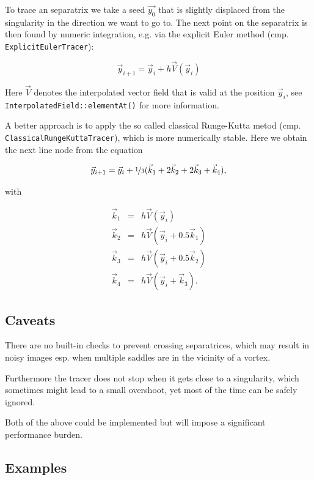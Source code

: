 \documentclass[a4paper,10pt,notitlepage]{scrreprt}
\begin{document}
To trace an separatrix we take a seed $\vec{y_0}$ that is slightly displaced
from the singularity in the direction we want to go to. The next point on the
separatrix is then found by numeric integration, e.g. via the explicit Euler
method (cmp. \texttt{ExplicitEulerTracer}):

\begin{equation}
 \vec{y}_{i+1} = \vec{y}_i + h \vec{V}(\vec{y}_i)
\end{equation}

Here $\vec{V}$ denotes the interpolated vector field that is valid at the
position $\vec{y}_i$, see \texttt{InterpolatedField::elementAt()} for more
information.

A better approach is to apply the so called classical Runge-Kutta
metod (cmp. \texttt{ClassicalRungeKuttaTracer}), which is more numerically
stable. Here we obtain the next line node from the equation

\begin{equation}
 \vec{y}_{i+1} = \vec{y}_i + \nicefrac{1}{3} (\vec{k}_1 + 2 \vec{k}_2 + 2
\vec{k}_3 + \vec{k}_4),
\end{equation}

with

\begin{eqnarray}
 \vec{k}_1 &=& h \vec{V}(\vec{y}_i) \\
 \vec{k}_2 &=& h \vec{V}(\vec{y}_i + 0.5 \vec{k}_1) \\
 \vec{k}_3 &=& h \vec{V}(\vec{y}_i + 0.5 \vec{k}_2) \\
 \vec{k}_4 &=& h \vec{V}(\vec{y}_i + \vec{k}_3).
\end{eqnarray}

\subsection{Caveats}

There are no built-in checks to prevent crossing separatrices, which may result
in noisy images esp. when multiple saddles are in the vicinity of a vortex.

Furthermore the tracer does not stop when it gets close to a singularity, which
sometimes might lead to a small overshoot, yet most of the time can be safely
ignored.

Both of the above could be implemented but will impose a significant
performance burden.

\subsection{Examples}
\end{document}

